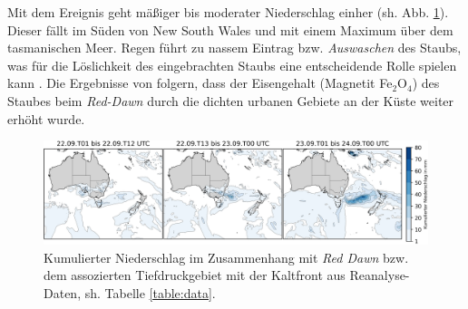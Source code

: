 \documentclass[12pt,a4paper,onecolumn,headheight=30pt]{scrartcl}
\begin{document}
Mit dem Ereignis geht mäßiger bis moderater Niederschlag einher (sh. Abb.  \ref{fig:rain}). Dieser fällt im Süden von New South Wales und mit einem Maximum über dem tasmanischen Meer. Regen führt zu nassem Eintrag bzw. \textit{Auswaschen} des Staubs, was  für die Löslichkeit des eingebrachten Staubs eine entscheidende Rolle spielen kann \citep{Shao.2011}. Die Ergebnisse von \citet{Reynolds.2014} folgern, dass der Eisengehalt (Magnetit Fe$_2$O$_4$) des Staubes beim \textit{Red-Dawn} durch die dichten urbanen Gebiete an der Küste weiter erhöht wurde.
\begin{figure}[htbp]
\includegraphics[width=\textwidth]{bilder/reddawn/rain.png}
\caption{Kumulierter Niederschlag im Zusammenhang mit \textit{Red Dawn} bzw. dem assozierten Tiefdruckgebiet mit der Kaltfront aus Reanalyse-Daten, sh. Tabelle \ref{table:data}.} \label{fig:rain}
\end{figure}
\end{document}
